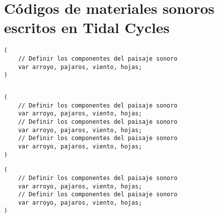 \section*{Códigos de materiales sonoros escritos en Tidal Cycles}



\begin{minipage}[t]{.48\textwidth}
    \begin{lstlisting}[style=SuperCollider-IDE, basicstyle=\footnotesize\ttfamily, numbers=none]
(
    // Definir los componentes del paisaje sonoro
    var arroyo, pajaros, viento, hojas;
)          
    \end{lstlisting}
\end{minipage}\hfill
\begin{minipage}[t]{.48\textwidth}
    \begin{lstlisting}[style=SuperCollider-IDE, basicstyle=\footnotesize\ttfamily, numbers=none]
% Código de programación      
    \end{lstlisting}
\end{minipage}

\vspace{20pt} %

\begin{minipage}[t]{.48\textwidth}
    \begin{lstlisting}[style=SuperCollider-IDE, basicstyle=\footnotesize\ttfamily, numbers=none]
(
    // Definir los componentes del paisaje sonoro
    var arroyo, pajaros, viento, hojas;
    // Definir los componentes del paisaje sonoro
    var arroyo, pajaros, viento, hojas;
    // Definir los componentes del paisaje sonoro
    var arroyo, pajaros, viento, hojas;
)          
    \end{lstlisting}
\end{minipage}\hfill
\begin{minipage}[t]{.48\textwidth}
    \begin{lstlisting}[style=SuperCollider-IDE, basicstyle=\footnotesize\ttfamily, numbers=none]
(
    // Definir los componentes del paisaje sonoro
    var arroyo, pajaros, viento, hojas;
    // Definir los componentes del paisaje sonoro
    var arroyo, pajaros, viento, hojas;
)          
    \end{lstlisting}
\end{minipage}

